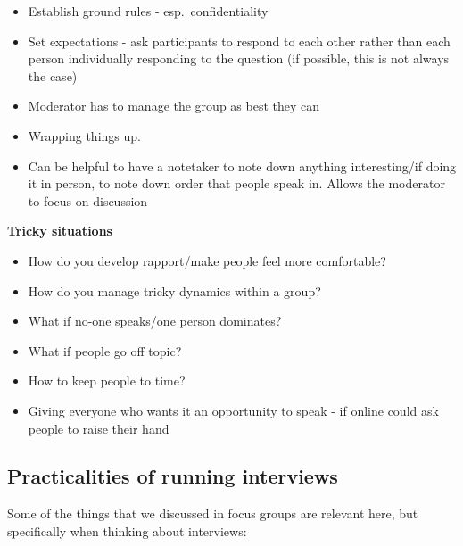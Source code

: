 \documentclass[
  english,
  letterpaper,
  DIV=11,
  numbers=noendperiod]{scrreprt}
\providecommand{\tightlist}{%
  \setlength{\itemsep}{0pt}\setlength{\parskip}{0pt}}
\begin{document}
\begin{itemize}
\tightlist
\item
  Establish ground rules - esp.~confidentiality
\item
  Set expectations - ask participants to respond to each other rather
  than each person individually responding to the question (if possible,
  this is not always the case)
\item
  Moderator has to manage the group as best they can
\item
  Wrapping things up.
\item
  Can be helpful to have a notetaker to note down anything
  interesting/if doing it in person, to note down order that people
  speak in. Allows the moderator to focus on discussion
\end{itemize}

\textbf{Tricky situations}

\begin{itemize}
\tightlist
\item
  How do you develop rapport/make people feel more comfortable?
\item
  How do you manage tricky dynamics within a group?
\item
  What if no-one speaks/one person dominates?
\item
  What if people go off topic?
\item
  How to keep people to time?
\item
  Giving everyone who wants it an opportunity to speak - if online could
  ask people to raise their hand
\end{itemize}

\subsection{Practicalities of running
interviews}\label{practicalities-of-running-interviews}

Some of the things that we discussed in focus groups are relevant here,
but specifically when thinking about interviews:
\end{document}

